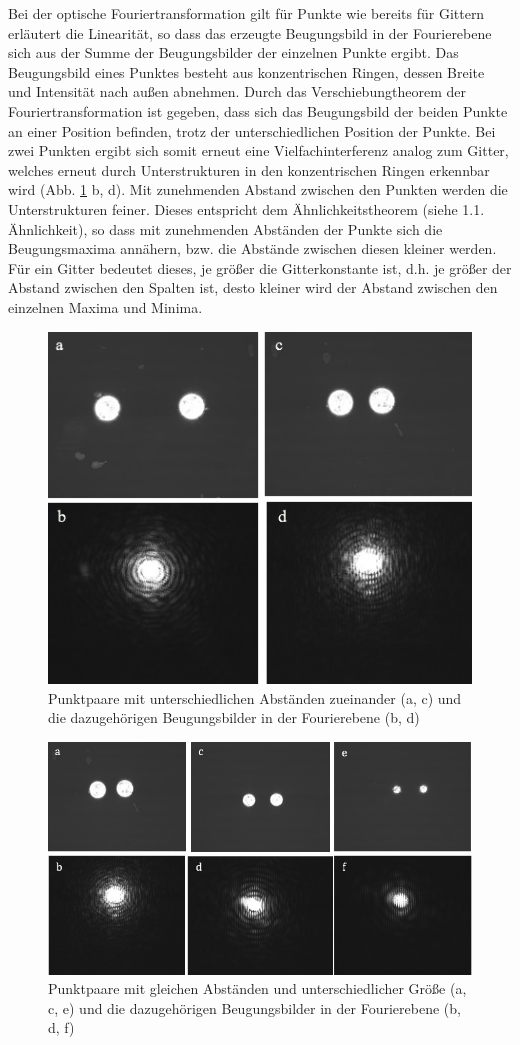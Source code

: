 Bei der optische Fouriertransformation gilt für Punkte wie bereits für Gittern erläutert die Linearität, so dass das erzeugte Beugungsbild in der Fourierebene sich aus der Summe der
Beugungsbilder der einzelnen Punkte ergibt. Das Beugungsbild eines Punktes besteht aus konzentrischen Ringen, dessen Breite und Intensität nach außen abnehmen. Durch das Verschiebungtheorem der Fouriertransformation ist gegeben, dass sich das Beugungsbild der
beiden Punkte an einer Position befinden, trotz der unterschiedlichen Position der Punkte. Bei zwei Punkten ergibt sich somit erneut eine Vielfachinterferenz analog zum Gitter, welches
erneut durch Unterstrukturen in den konzentrischen Ringen erkennbar wird (Abb. \ref{fig:punktpaare_verschieden_und_spektren} b, d). Mit zunehmenden Abstand zwischen den Punkten werden die Unterstrukturen feiner. Dieses entspricht dem Ähnlichkeitstheorem (siehe 1.1. Ähnlichkeit), so dass mit zunehmenden Abständen der Punkte sich die Beugungsmaxima annähern, bzw. die Abstände zwischen diesen kleiner werden. Für ein Gitter bedeutet dieses, je größer die Gitterkonstante ist, d.h. je größer der Abstand zwischen den Spalten ist, desto kleiner wird der Abstand zwischen den einzelnen Maxima und Minima.

\begin{figure}[h]
	\centering
	\includegraphics[width=0.10\linewidth]{Regina/abb15}
	\caption[Punktpaare unterschiedlicher Abstände und Fourierspektren]{Punktpaare mit unterschiedlichen Abständen zueinander (a, c) und die 
	dazugehörigen Beugungsbilder in der Fourierebene (b, d)}
	\label{fig:punktpaare_verschieden_und_spektren}
\end{figure}


\begin{figure}[h]
	\centering
	\includegraphics[width=0.10\linewidth]{Regina/abb16}
	\caption[Punktpaare gleicher Abstände und Fourierspektren]{Punktpaare mit gleichen Abständen und unterschiedlicher Größe (a, c, e) und die dazugehörigen Beugungsbilder in der Fourierebene (b, d, f)}
	\label{fig:punktpaare_gleich_und_spektren}
\end{figure}

